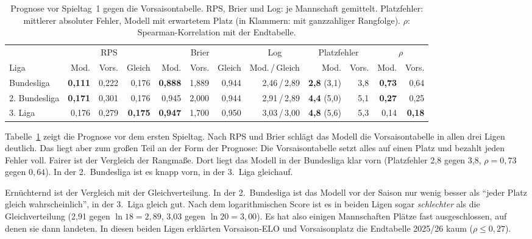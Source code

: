 \documentclass[11pt,a4paper,parskip=half,numbers=noenddot]{scrartcl}
\newcommand{\tab}[1]{Tabelle~\ref{#1}}
\begin{document}
\begin{table}[!htbp]
\centering\footnotesize\setlength{\tabcolsep}{3.5pt}
\caption{Prognose vor Spieltag~1 gegen die Vorsaisontabelle. RPS, Brier und
Log: je Mannschaft gemittelt. Platzfehler: mittlerer absoluter Fehler,
Modell mit erwartetem Platz (in Klammern: mit ganzzahliger Rangfolge).
$\rho$: Spearman-Korrelation mit der Endtabelle.}\label{tab:vorsaison}
\begin{tabular}{@{}l rrr rrr r rr rr@{}}
\toprule
& \multicolumn{3}{c}{RPS} & \multicolumn{3}{c}{Brier} & \multicolumn{1}{c}{Log}
& \multicolumn{2}{c}{Platzfehler} & \multicolumn{2}{c}{$\rho$} \\
\cmidrule(lr){2-4}\cmidrule(lr){5-7}\cmidrule(lr){8-8}\cmidrule(lr){9-10}\cmidrule(l){11-12}
Liga & Mod. & Vors. & Gleich & Mod. & Vors. & Gleich & Mod.\,/\,Gleich & Mod. & Vors. & Mod. & Vors. \\
\midrule
Bundesliga    & \textbf{0,111} & 0,222 & 0,176 & \textbf{0,888} & 1,889 & 0,944 & 2,46\,/\,2,89 & \textbf{2,8} (3,1) & 3,8 & \textbf{0,73} & 0,64 \\
2. Bundesliga & \textbf{0,171} & 0,301 & 0,176 & 0,945 & 2,000 & 0,944 & 2,91\,/\,2,89 & \textbf{4,4} (5,0) & 5,1 & \textbf{0,27} & 0,25 \\
3. Liga       & 0,176 & 0,279 & \textbf{0,175} & \textbf{0,947} & 1,700 & 0,950 & 3,03\,/\,3,00 & \textbf{4,8} (5,6) & 5,3 & 0,14 & \textbf{0,18} \\
\bottomrule
\end{tabular}
\end{table}

\tab{tab:vorsaison} zeigt die Prognose vor dem ersten Spieltag. Nach RPS
und Brier schlägt das Modell die Vorsaisontabelle in allen drei Ligen
deutlich. Das liegt aber zum großen Teil an der Form der Prognose: Die
Vorsaisontabelle setzt alles auf einen Platz und bezahlt jeden Fehler voll.
Fairer ist der Vergleich der Rangmaße. Dort liegt das Modell in der
Bundesliga klar vorn (Platzfehler 2,8 gegen 3,8, $\rho = 0{,}73$ gegen
$0{,}64$). In der 2.~Bundesliga ist es knapp vorn, in der 3.~Liga
gleichauf.

Ernüchternd ist der Vergleich mit der Gleichverteilung. In der
2.~Bundesliga ist das Modell vor der Saison nur wenig besser als
\enquote{jeder Platz gleich wahrscheinlich}, in der 3.~Liga gleich gut. Nach
dem logarithmischen Score ist es in beiden Ligen sogar \emph{schlechter} als
die Gleichverteilung (2,91 gegen $\ln 18 = 2{,}89$, 3,03 gegen
$\ln 20 = 3{,}00$). Es hat also einigen Mannschaften Plätze fast
ausgeschlossen, auf denen sie dann landeten. In diesen beiden Ligen
erklärten Vorsaison-ELO und Vorsaisonplatz die Endtabelle 2025/26 kaum
($\rho \le 0{,}27$).
\end{document}
